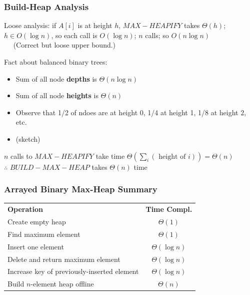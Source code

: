 \documentclass{beamer}
\newcommand{\stanza}{ \\~\ }
\begin{document}
\begin{frame} \frametitle{Build-Heap Analysis}
Loose analysis: if $A[i]$ is at height $h$, $MAX-HEAPIFY$ takes $\Theta(h)$;
  $h \in O(\log n)$, so each call is $O(\log n)$; $n$ calls; so $O(n \log n)$ \stanza
(Correct but loose upper bound.)

Fact about balanced binary trees:
\begin{itemize}
  \item Sum of all node \textbf{depths} is $\Theta(n \log n)$
  \item Sum of all node \textbf{heights} is $\Theta(n)$
  \item Observe that 1/2 of ndoes are at height 0, 1/4 at height 1, 1/8 at height 2, etc.
  \item (sketch)
\end{itemize}

$n$ calls to $MAX-HEAPIFY$ take time $\Theta(\sum_i (\text{ height of } i)) = \Theta(n)$ \\
$\therefore$ $BUILD-MAX-HEAP$ takes $\Theta(n)$ time
\end{frame}

\begin{frame} \frametitle{Arrayed Binary Max-Heap Summary}

\begin{center}
  \begin{tabular}{lc}
    \textbf{Operation} & \textbf{Time Compl.} \\
    Create empty heap & $\Theta(1)$ \\
    Find maximum element & $\Theta(1)$ \\
    Insert one element & $\Theta(\log n)$ \\
    Delete and return maximum element & $\Theta(\log n)$ \\
    Increase key of previously-inserted element & $\Theta(\log n)$ \\
    Build $n$-element heap offline & $\Theta(n)$ \\
  \end{tabular}
\end{center}

\end{frame}
\end{document}
